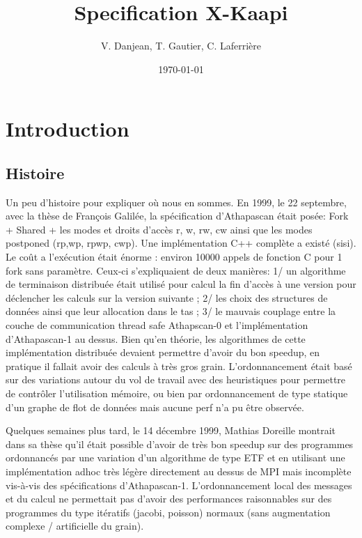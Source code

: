 \documentclass{report}
\begin{document}
\title{Specification X-Kaapi}
\author{V. Danjean, T. Gautier, C. Laferrière}
\date{\today}
\maketitle

\newpage
\chapter{Introduction}


\section{Histoire}
Un peu d'histoire pour expliquer où nous en sommes.
En 1999, le 22 septembre, avec la thèse de François Galilée, la spécification d'Athapascan était posée: Fork + Shared + les modes et droits d'accès r, w, rw, cw ainsi que les modes postponed (rp,wp, rpwp, cwp). Une implémentation C++ complète a existé (sisi). Le coût a l'exécution était énorme : environ 10000 appels de fonction C pour 1 fork sans paramètre. Ceux-ci s'expliquaient de deux manières: 1/ un algorithme de terminaison distribuée était utilisé pour calcul la fin d'accès à une version pour déclencher les calculs sur la version suivante ; 2/ les choix des structures de données ainsi que leur allocation dans le tas ; 3/ le mauvais couplage entre la couche de communication thread safe Athapscan-0 et l'implémentation d'Athapascan-1 au dessus. Bien qu'en théorie, les algorithmes de cette implémentation distribuée devaient permettre d'avoir du bon speedup, en pratique il fallait avoir des calculs à très gros grain. L'ordonnancement était basé sur des variations autour du vol de travail avec des heuristiques pour permettre de contrôler l'utilisation mémoire, ou bien par ordonnancement de type statique d'un graphe de flot de données mais aucune perf n'a pu être observée.

Quelques semaines plus tard, le 14 décembre 1999, Mathias Doreille montrait dans sa thèse qu'il était possible d'avoir de très bon speedup sur des programmes ordonnancés par une variation d'un algorithme de type ETF et en utilisant une implémentation adhoc très légère directement au dessus de MPI mais incomplète vis-à-vis des spécifications d'Athapascan-1. L'ordonnancement local des messages et du calcul ne permettait pas d'avoir des performances raisonnables sur des programmes du type itératifs (jacobi, poisson) normaux (sans augmentation complexe / artificielle du grain).
\end{document}

